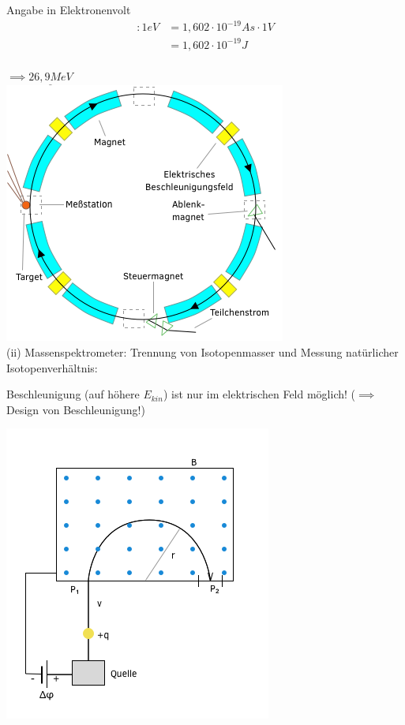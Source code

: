   Angabe in Elektronenvolt \begin{align}
  	[eV]:1eV&= 1,602\cdot 10^{-19}As \cdot 1V\\
  	&=1,602\cdot 10^{-19}J
  \end{align}\\
  
  $\implies \underline{26,9MeV}$\\
  
  \includegraphics{skizzen/16/16_1B04}\\
  
  (ii) Massenspektrometer: Trennung von Isotopenmasser und Messung natürlicher Isotopenverhältnis:
  
  Beschleunigung (auf höhere $ E_{kin} $) ist nur im elektrischen Feld möglich! ($\implies$ Design von Beschleunigung!)
  
  \includegraphics{skizzen/16/16_1B05}\\
  
